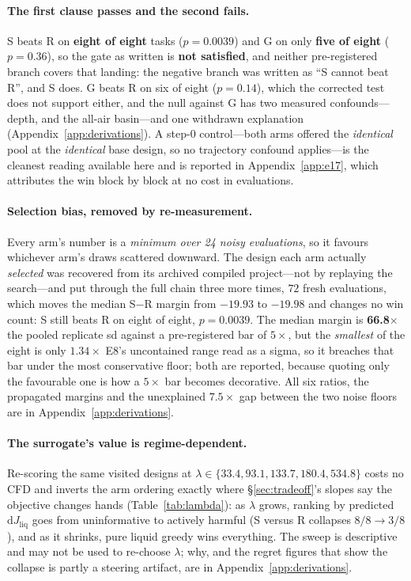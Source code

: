 \documentclass{article}
\newcommand{\Jliq}{J_{\mathrm{liq}}}
\begin{document}
\paragraph{The first clause passes and the second fails.}
S beats R on \textbf{eight of eight} tasks ($p = 0.0039$) and G on only \textbf{five of
eight} ($p = 0.36$), so the gate as written is \textbf{not satisfied}, and neither
pre-registered branch covers that landing: the negative branch was written as ``S cannot
beat R'', and S does.  G beats R on six of eight ($p = 0.14$), which the corrected test does
not support either, and the null against G has two measured confounds---depth, and the
all-air basin---and one withdrawn explanation (Appendix~\ref{app:derivations}).  A step-0 control---both arms
offered the \emph{identical} pool at the \emph{identical} base design, so no trajectory confound
applies---is the cleanest reading available here and is reported in Appendix~\ref{app:e17}, which
attributes the win block by block at no cost in evaluations.

\paragraph{Selection bias, removed by re-measurement.}
Every arm's number is a \emph{minimum over 24 noisy evaluations}, so it favours whichever
arm's draws scattered downward.  The design each arm actually \emph{selected} was recovered
from its archived compiled project---not by replaying the search---and put through the full
chain three more times, $72$ fresh evaluations, which moves the median S$-$R margin from
$-19.93$ to $\mathbf{-19.98}$ and changes no win count: S still beats R on eight of eight,
$p = 0.0039$.  The median margin is \textbf{66.8$\times$} the pooled replicate sd against a
pre-registered bar of $5\times$, but the \emph{smallest} of the eight is only
$1.34\times$ E8's uncontained range read as a sigma, so it breaches that bar under the most
conservative floor; both are reported, because quoting only the favourable one is how a
$5\times$ bar becomes decorative.  All six ratios, the propagated margins and the unexplained
$7.5\times$ gap between the two noise floors are in Appendix~\ref{app:derivations}.



\paragraph{The surrogate's value is regime-dependent.}
Re-scoring the same visited designs at $\lambda \in \{33.4, 93.1, 133.7, 180.4, 534.8\}$
costs no CFD and inverts the arm ordering exactly where \S\ref{sec:tradeoff}'s slopes say
the objective changes hands (Table~\ref{tab:lambda}): as $\lambda$ grows, ranking by
predicted $\mathrm{d}\Jliq$ goes from uninformative to actively harmful (S versus R
collapses $8/8 \to 3/8$), and as it shrinks, pure liquid greedy wins everything.  The sweep
is descriptive and may not be used to re-choose $\lambda$; why, and the regret figures that
show the collapse is partly a steering artifact, are in Appendix~\ref{app:derivations}.
\end{document}
